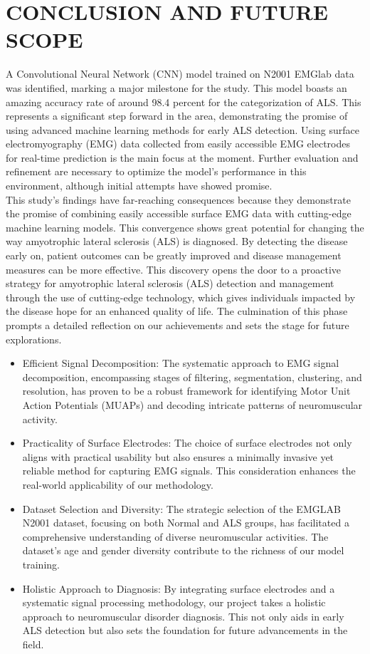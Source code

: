 \documentclass[ 12pt,a4paper,twocolumn,fleqn]{report}
\begin{document}
\chapter{CONCLUSION AND FUTURE SCOPE}
A Convolutional Neural Network (CNN) model trained on N2001
EMGlab data was identified, marking a major milestone for the
study. This model boasts an amazing accuracy rate of around 98.4
percent for the categorization of ALS. This represents a significant
step forward in the area, demonstrating the promise of using advanced machine learning methods for early ALS detection. Using
surface electromyography (EMG) data collected from easily accessible EMG electrodes for real-time prediction is the main focus at
the moment. Further evaluation and refinement are necessary to optimize the model’s performance in this environment, although initial attempts have showed promise.\\
This study’s findings have far-reaching consequences because they
demonstrate the promise of combining easily accessible surface
EMG data with cutting-edge machine learning models. This convergence shows great potential for changing the way amyotrophic
lateral sclerosis (ALS) is diagnosed. By detecting the disease early
on, patient outcomes can be greatly improved and disease management measures can be more effective. This discovery opens the
door to a proactive strategy for amyotrophic lateral sclerosis (ALS)
detection and management through the use of cutting-edge technology, which gives individuals impacted by the disease hope for an
enhanced quality of life. The culmination of this phase prompts a detailed reflection on our
achievements and sets the stage for future explorations.\\
\begin{itemize}
    \item Efficient Signal Decomposition: The systematic approach to EMG signal decomposition,
encompassing stages of filtering, segmentation, clustering, and resolution, has proven to be a
robust framework for identifying Motor Unit Action Potentials (MUAPs) and decoding intricate
patterns of neuromuscular activity.
\item Practicality of Surface Electrodes: The choice of surface electrodes not only aligns with
practical usability but also ensures a minimally invasive yet reliable method for capturing EMG
signals. This consideration enhances the real-world applicability of our methodology.
\newpage
  \pagestyle{fancy}
\thisfancypage{%
  \setlength{\fboxsep}{20pt}\doublebox}{}
\normalsize
\item Dataset Selection and Diversity: The strategic selection of the EMGLAB N2001 dataset,
focusing on both Normal and ALS groups, has facilitated a comprehensive understanding of
diverse neuromuscular activities. The dataset's age and gender diversity contribute to the
richness of our model training.
\item Holistic Approach to Diagnosis: By integrating surface electrodes and a systematic signal
processing methodology, our project takes a holistic approach to neuromuscular disorder
diagnosis. This not only aids in early ALS detection but also sets the foundation for future
advancements in the field.
\end{itemize}
\end{document}
